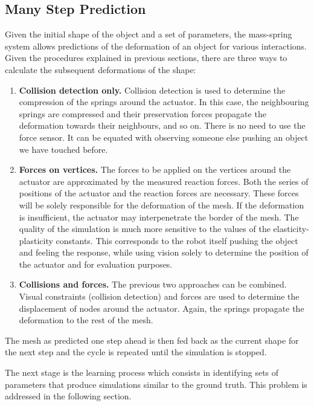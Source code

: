 \documentclass[journal]{IEEEtran}
\newcommand{\comment}[1]{{\color{red} #1}}
\begin{document}
\subsection{Many Step Prediction}
\label{sec:manysteps}

Given the initial shape of the object and a set of parameters, the mass-spring system allows predictions of the deformation of an object for various interactions.  Given the procedures explained in previous sections, there are three ways to calculate the subsequent deformations of the shape:
\begin{enumerate}
 \item \textbf{Collision detection only.} Collision detection is used to determine the compression of the springs around the actuator.  In this case, the neighbouring springs are compressed and their preservation forces propagate the deformation towards their neighbours, and so on.  There is no need to use the force sensor.  It can be equated with observing someone else pushing an object we have touched before.
 \item \textbf{Forces on vertices.} The forces to be applied on the  vertices around the actuator are approximated by the measured reaction forces.  Both the series of positions of the actuator and the reaction forces are necessary.  These forces will be solely responsible for the deformation of the mesh.  If the deformation is insufficient, the actuator may interpenetrate the border of the mesh.  The quality of the simulation is much more sensitive to the values of the elasticity-plasticity constants.  This corresponds to the robot itself pushing the object and feeling the response, while using vision solely to determine the position of the actuator and for evaluation purposes.
 \item \textbf{Collisions and forces.} The previous two approaches can be combined.  Visual constraints (collision detection) and forces are used to determine the displacement of nodes around the actuator.  Again, the springs propagate the deformation to the rest of the mesh.
\end{enumerate}
The mesh as predicted one step ahead is then fed back as the current shape for the next step and the cycle is repeated until the simulation is stopped.

The next stage \comment{is} the learning process \comment{which} consists in identifying sets of parameters that produce simulations similar to the ground truth.  This problem is addressed in the following section.
\end{document}
